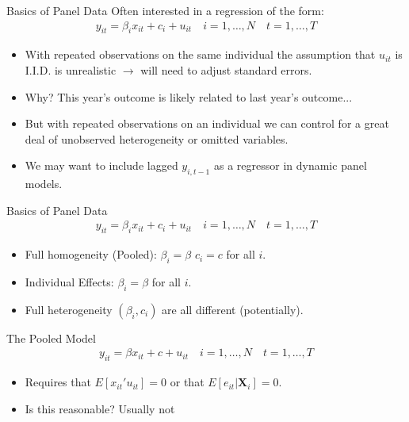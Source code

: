 \begin{frame}{Basics of Panel Data}
Often interested in a regression of the form:
\begin{align*}
y_{it} = \beta_i x_{it} + c_i + u_{it} \quad i=1,\ldots,N \quad t=1,\ldots,T
\end{align*}
\begin{itemize}
\item With \alert{repeated observations} on the same individual the assumption that $u_{it}$ is I.I.D. is unrealistic $\rightarrow$ will need to adjust standard errors.
\item Why? This year's outcome is likely related to last year's outcome...
\item But with repeated observations on an individual we can control for a great deal of \alert{unobserved heterogeneity} or omitted variables.
\item We may want to include lagged $y_{i,t-1}$ as a regressor in \alert{dynamic panel} models.
\end{itemize}
\end{frame}


\begin{frame}{Basics of Panel Data}
\begin{align*}
y_{it} = \beta_i x_{it} + c_i + u_{it} \quad i=1,\ldots,N \quad t=1,\ldots,T
\end{align*}
\begin{itemize}
\item Full homogeneity (\alert{Pooled}): $\beta_i = \beta$ $c_i = c$ for all $i$. 
\item \alert{Individual Effects}: $\beta_i = \beta$ for all $i$.
\item \alert{Full heterogeneity} $(\beta_i,c_i)$ are all different (potentially).
\end{itemize}
\end{frame}


\begin{frame}{The Pooled Model}
\begin{align*}
y_{it} = \beta x_{it} + c + u_{it} \quad i=1,\ldots,N \quad t=1,\ldots,T
\end{align*}
\begin{itemize}
\item Requires that $E[x_{it}' u_{it}]=0$ or that $E[ e_{it} | \mathbf{X}_i]=0$.
\item Is this reasonable? Usually not
\end{itemize}
\end{frame}

